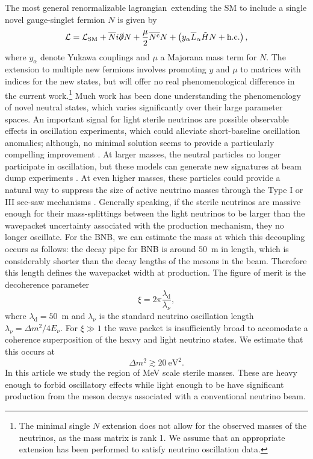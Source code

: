 \documentclass[11pt, a4paper]{article}
\def\lagrangian{lagrangian}
\begin{document}
The most general renormalizable \lagrangian\ extending the SM to include a
single novel gauge-singlet fermion $N$ is given by
%
\begin{align}   \mathcal{L} = \mathcal{L}_\text{SM} +
\overline{N}i\slashed{\partial}N+ \frac{\mu}{2} \overline{N^\text{c}}N  +
\left( y_\alpha\overline{L}_\alpha\tilde{H} N
+\text{h.c.}\right),\label{eq:minimallag} \end{align}
%
where $y_\alpha$ denote Yukawa couplings and $\mu$ a Majorana mass term for
$N$. The extension to multiple new fermions involves promoting $y$ and $\mu$ to
matrices with indices for the new states, but will offer no real
phenomenological difference in the current work.\footnote{The minimal single
$N$ extension does not allow for the observed masses of the neutrinos, as the
mass matrix is rank 1. We assume that an appropriate extension has been
performed to satisfy neutrino oscillation data.} Much work has been done
understanding the phenomenology of novel neutral states, which varies
significantly over their large parameter spaces. An important signal for light
sterile neutrinos are possible observable effects in oscillation experiments,
which could alleviate short-baseline oscillation anomalies; although, no
minimal solution seems to provide a particularly compelling improvement
\cite{Kopp:2013vaa}. At larger masses, the neutral particles no longer
participate in oscillation, but these models can generate new signatures at
beam dump experiments \cite{}. At even higher masses, these particles could
provide a natural way to suppress the size of active neutrino masses through
the Type I or III see-saw mechanisms \cite{Minkowski:1977sc, GellMann:1980vs,
Mohapatra:1979ia}. 
%
Generally speaking, if the sterile neutrinos are massive enough for their
mass-splittings between the light neutrinos to be larger than the wavepacket
uncertainty associated with the production mechanism, they no longer oscillate.
For the BNB, we can estimate the mass at which this decoupling occurs as
follows: the decay pipe for BNB is around $50$~m in length, which is
considerably shorter than the decay lengths of the mesons in the beam.
Therefore this length defines the wavepacket width at production. The figure of
merit is the decoherence parameter \cite{Akhmedov:2009rb,Hernandez:2011rs}
%
\[  \xi = 2\pi \frac{\lambda_\text{d}}{\lambda_\nu}, \]
%
where $\lambda_\text{d} = 50$~m and $\lambda_\nu$ is the standard neutrino
oscillation length $\lambda_\nu = \Delta m^2/4E_\nu$. For $\xi\gg1$ the wave
packet is insufficiently broad to accomodate a coherence superposition of the
heavy and light neutrino states. We estimate that this occurs at 
%
\[  \Delta m^2 \gtrsim 20~\text{eV}^2. \] 
%
In this article we study the region of MeV scale sterile masses. These are
heavy enough to forbid oscillatory effects while light enough to be have
significant production from the meson decays associated with a conventional
neutrino beam. 
\end{document}
